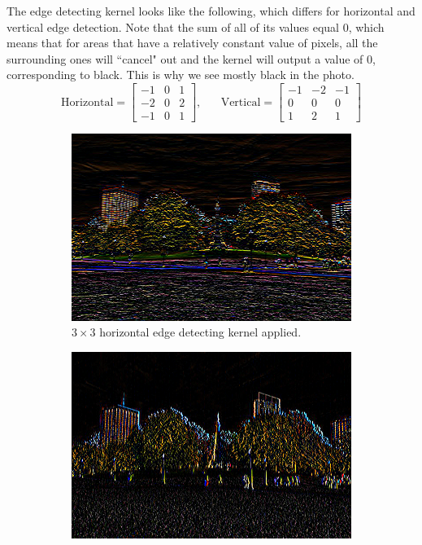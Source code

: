 \documentclass{article}
\begin{document}
    \begin{example}
      The edge detecting kernel looks like the following, which differs for horizontal and vertical edge detection. Note that the sum of all of its values equal $0$, which means that for areas that have a relatively constant value of pixels, all the surrounding ones will ``cancel" out and the kernel will output a value of $0$, corresponding to black. This is why we see mostly black in the photo. 
      \[\text{Horizontal} = \begin{bmatrix} -1 & 0 & 1 \\ -2 & 0 & 2 \\ -1 & 0 & 1 \end{bmatrix}, \;\;\;\;\;\; \text{Vertical} = \begin{bmatrix} -1 & -2 & -1 \\ 0 & 0 & 0 \\ 1 & 2 & 1 \end{bmatrix}\]
      \begin{figure}[H]
          \centering
          \begin{subfigure}[b]{0.45\textwidth}
          \centering
              \includegraphics[width=\textwidth]{img/OpenCV/Horizontal.png}
              \caption{$3 \times 3$ horizontal edge detecting kernel applied. }
              \label{fig:Horizontal}
          \end{subfigure}
          \begin{subfigure}[b]{0.45\textwidth}
          \centering
              \includegraphics[width=\textwidth]{img/OpenCV/Vertical.png}

\end{subfigure}
\end{figure}
\end{example}
\end{document}
